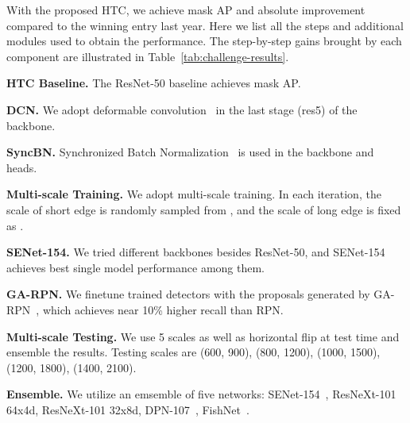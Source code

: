 \documentclass[10pt,twocolumn,letterpaper]{article}
\begin{document}
With the proposed HTC, we achieve  mask AP and  absolute improvement compared to the winning entry last year.
Here we list all the steps and additional modules used to obtain the performance.
The step-by-step gains brought by each component are illustrated in Table~\ref{tab:challenge-results}.

\noindent\textbf{HTC Baseline.}
The ResNet-50 baseline achieves  mask AP.

\noindent\textbf{DCN.}
We adopt deformable convolution~\cite{dai2017deformable} in the last stage (res5) of the backbone.

\noindent\textbf{SyncBN.}
Synchronized Batch Normalization~\cite{peng2018megdet,liu2018path} is used in the backbone and heads.

\noindent\textbf{Multi-scale Training.}
We adopt multi-scale training. In each iteration, the scale of short edge is randomly sampled from , and the scale of long edge is fixed as .

\noindent\textbf{SENet-154.}
We tried different backbones besides ResNet-50, and SENet-154~\cite{Hu_2018_CVPR} achieves best single model performance among them.

\noindent\textbf{GA-RPN.}
We finetune trained detectors with the proposals generated by GA-RPN~\cite{wang2019region},
which achieves near 10\% higher recall than RPN.

\noindent\textbf{Multi-scale Testing.}
We use 5 scales as well as horizontal flip at test time and ensemble the results.
Testing scales are (600, 900), (800, 1200), (1000, 1500), (1200, 1800), (1400, 2100).

\noindent\textbf{Ensemble.}
We utilize an emsemble of five networks: SENet-154~\cite{Hu_2018_CVPR}, ResNeXt-101~\cite{xie2017aggregated} 64x4d, ResNeXt-101 32x8d, DPN-107~\cite{chen2017dual}, FishNet~\cite{fishnet_18_nips}.
\end{document}
